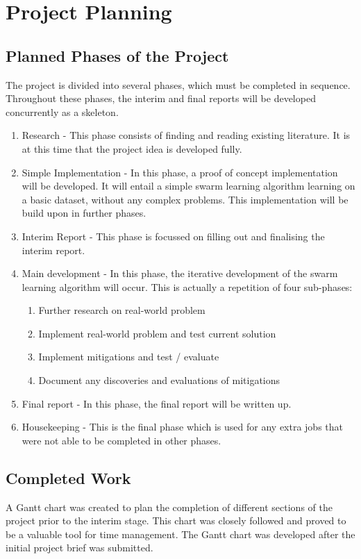 \chapter{Project Planning}

\section{Planned Phases of the Project}
The project is divided into several phases, which must be completed in sequence. Throughout these phases, the interim and final reports will be developed concurrently as a skeleton.
\begin{enumerate}
	\item Research - This phase consists of finding and reading existing literature. It is at this time that the project idea is developed fully.
	\item Simple Implementation - In this phase, a proof of concept implementation will be developed. It will entail a simple swarm learning algorithm learning on a basic dataset, without any complex problems. This implementation will be build upon in further phases.
	\item Interim Report - This phase is focussed on filling out and finalising the interim report.
	\item Main development - In this phase, the iterative development of the swarm learning algorithm will occur. This is actually a repetition of four sub-phases:
	\begin{enumerate}
		\item Further research on real-world problem
		\item Implement real-world problem and test current solution
		\item Implement mitigations and test / evaluate
		\item Document any discoveries and evaluations of mitigations
	\end{enumerate}
	\item Final report - In this phase, the final report will be written up.
	\item Housekeeping - This is the final phase which is used for any extra jobs that were not able to be completed in other phases.
\end{enumerate}



\section{Completed Work}
A Gantt chart was created to plan the completion of different sections of the project prior to the interim stage. This chart was closely followed and proved to be a valuable tool for time management. The Gantt chart was developed after the initial project brief was submitted.

